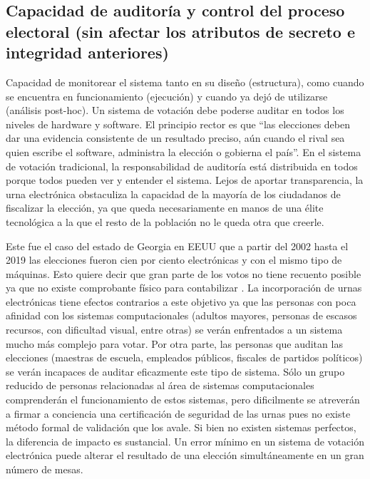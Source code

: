 \subsection{Capacidad de auditoría y control del proceso electoral (sin afectar los atributos de secreto e integridad anteriores)}
Capacidad de monitorear el sistema tanto en su diseño (estructura), como cuando se encuentra en funcionamiento (ejecución) y cuando ya dejó de utilizarse (análisis post-hoc). Un sistema de votación debe poderse auditar en todos los niveles de hardware y software. El principio rector es que ``las elecciones deben dar una evidencia consistente de un resultado preciso, aún cuando el rival sea quien escribe el software, administra la elección o gobierna el país''.\newline
En el sistema de votación tradicional, la responsabilidad de auditoría está distribuida en todos porque todos pueden ver y entender el sistema. Lejos de aportar transparencia, la urna electrónica obstaculiza la capacidad de la mayoría de los ciudadanos de fiscalizar la elección, ya que queda necesariamente en manos de una élite tecnológica a la que el resto de la población no le queda otra que creerle.

Este fue el caso del estado de Georgia en EEUU que a partir del 2002 hasta el 2019 las elecciones fueron cien por ciento electrónicas y con el mismo tipo de máquinas. Esto quiere decir que gran parte de los votos no tiene recuento posible ya que no existe comprobante físico para contabilizar \cite{eleccionesGeorgia}.\newline
La incorporación de urnas electrónicas tiene efectos contrarios a este objetivo ya que las personas con poca afinidad con los sistemas computacionales (adultos mayores, personas de escasos recursos, con dificultad visual, entre otras) se verán enfrentados a un sistema mucho más complejo para votar. Por otra parte, las personas que auditan las elecciones (maestras de escuela, empleados públicos, fiscales de partidos políticos) se verán incapaces de auditar eficazmente este tipo de sistema. Sólo un grupo reducido de personas relacionadas al área de sistemas computacionales comprenderán el funcionamiento de estos sistemas, pero dificilmente se atreverán a firmar a conciencia una certificación de seguridad de las urnas pues no existe método formal de validación que los avale. Si bien no existen sistemas perfectos, la diferencia de impacto es sustancial. Un error mínimo en un sistema de votación electrónica puede alterar el resultado de una elección simultáneamente en un gran número de mesas.

